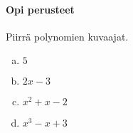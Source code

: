 \begin{tehtavasivu}

\paragraph*{Opi perusteet}

\begin{tehtava}
    Piirrä polynomien kuvaajat.
    \begin{enumerate}[a)]
        \item $5$
        \item $2x-3$
        \item $x^2+x-2$
        \item $x^3-x+3$
    \end{enumerate}   
    \begin{vastaus}
    	\item \begin{kuvaajapohja}{0.4}{-4}{4}{-1}{7}
			  \end{kuvaajapohja}
    	\item \begin{kuvaajapohja}{0.4}{-4}{4}{-5}{3}
			  \end{kuvaajapohja}
		\item \begin{kuvaajapohja}{0.4}{-4}{4}{-3}{5}
			  \end{kuvaajapohja}
		\item \begin{kuvaajapohja}{0.4}{-4}{4}{-3}{5}
			  \end{kuvaajapohja}
    \end{vastaus}
\end{tehtava}


\end{tehtavasivu}
